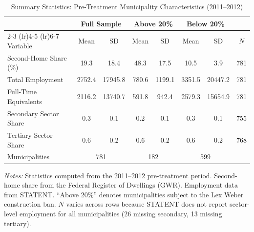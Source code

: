 \begin{table}[htbp]
\centering
\caption{Summary Statistics: Pre-Treatment Municipality Characteristics (2011--2012)}
\label{tab:summary}
\small
\begin{tabular}{lccccccc}
\toprule
 & \multicolumn{2}{c}{Full Sample} & \multicolumn{2}{c}{Above 20\%} & \multicolumn{2}{c}{Below 20\%} & \\
\cmidrule(lr){2-3} \cmidrule(lr){4-5} \cmidrule(lr){6-7}
Variable & Mean & SD & Mean & SD & Mean & SD & $N$ \\
\midrule
Second-Home Share (\%) & 19.3 & 18.4 & 48.3 & 17.5 & 10.5 & 3.9 & 781 \\
Total Employment & 2752.4 & 17945.8 & 780.6 & 1199.1 & 3351.5 & 20447.2 & 781 \\
Full-Time Equivalents & 2116.2 & 13740.7 & 591.8 & 942.4 & 2579.3 & 15654.9 & 781 \\
Secondary Sector Share & 0.3 & 0.1 & 0.2 & 0.1 & 0.3 & 0.1 & 755 \\
Tertiary Sector Share & 0.6 & 0.2 & 0.6 & 0.2 & 0.6 & 0.2 & 768 \\
\midrule
Municipalities & \multicolumn{2}{c}{781} & \multicolumn{2}{c}{182} & \multicolumn{2}{c}{599} & \\
\bottomrule
\end{tabular}
\begin{minipage}{0.95\textwidth}
\vspace{0.3em}
\footnotesize \textit{Notes:} Statistics computed from the 2011--2012 pre-treatment period.
Second-home share from the Federal Register of Dwellings (GWR). Employment data from STATENT.
``Above 20\%'' denotes municipalities subject to the Lex Weber construction ban.
$N$ varies across rows because STATENT does not report sector-level employment for all municipalities (26 missing secondary, 13 missing tertiary).
\end{minipage}
\end{table}
